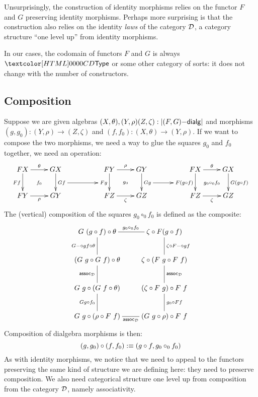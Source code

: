 Unsurprisingly, the construction of identity morphisms relies on the
functor $F$ and $G$ preserving identity morphisms. Perhaps more
surprising is that the construction also relies on the identity
\emph{laws} of the category $\mathcal{D}$, \ie a category structure ``one
level up'' from identity morphisms.

In our cases, the codomain of functors $F$ and $G$ is always $\Type$
or some other category of sorts: it does not change with the number of
constructors.

\subsection{Composition}

Suppose we are given algebras
$(X,\theta),(Y,\rho)(Z,\zeta) : | (F,G)\mathsf{-dialg} |$ and morphisms
$(g,g_0) : (Y,\rho) \to (Z,\zeta)$ and
$(f,f_0) : (X,\theta) \to (Y,\rho)$. If we want to compose the two
morphisms, we need a way to glue the squares $g_0$ and $f_0$ together,
\ie we need an operation:
$$
\xymatrix{
 FX \ar[r]^\theta \ar[d]_{F f}                 \ar@{}[dr]|{f_0} &GX \ar[d]^{G f}="Gf"
&
&FY \ar[r]^\rho   \ar[d]_{F g}="Fg"            \ar@{}[dr]|{g_0} &GY \ar[d]^{G g}="Gg"
&
&FX \ar[r]^\theta \ar[d]_{F (g \circ f)}="Fgf" \ar@{}[dr]|{g_0 \circ_0 f_0} &GX \ar[d]^{G (g \circ f)}
\\ 
 FY \ar[r]_{\rho}  &GY
&
&FZ \ar[r]_{\zeta} &GZ
&
&FZ \ar[r]_{\zeta} &GZ
\ar "Gf";"Fg"
\ar "Gg";"Fgf"
}
$$
The (vertical) composition of the squares $g_0 \circ_0 f_0$ is defined as the composite:
$$
\xymatrix{
G\ (g \circ f) \circ \theta
\ar@{-}[r]^{g_0 \circ_0 f_0}
\ar@{-}[d]_{\Gcomp g f \circ \theta}
&\zeta \circ F(g \circ f)
\ar@{-}[d]^{\zeta \circ \Fcomp g f}
\\
(G\ g \circ G\ f) \circ \theta
\ar@{-}[d]_{\assoc_{\Dd}}
&\zeta \circ (F\ g \circ F\ f)
\ar@{-}[d]^{\assoc_{\Dd}}
\\
G\ g \circ (G\ f \circ \theta)
\ar@{-}[d]_{G g \circ f_0}
&(\zeta \circ F\ g) \circ F\ f
\ar@{-}[d]^{g_0 \circ F f}
\\
G\ g \circ (\rho \circ F\ f)
\ar@{-}[r]_{\assoc_{\Dd}}
&(G\ g \circ \rho) \circ F\ f
}
$$
Composition of dialgebra morphisms is then:
$$
(g,g_0) \circ (f,f_0) :\equiv (g \circ f , g_0 \circ_0 f_0)
$$
As with identity morphisms, we notice that we need to appeal to the
functors preserving the same kind of structure we are defining here:
they need to preserve composition. We also need categorical structure
one level up from composition from the category $\mathcal{D}$, namely
associativity. 

